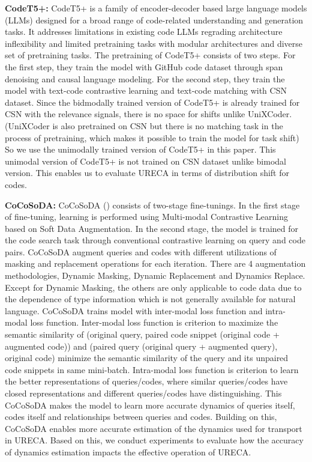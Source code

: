 \textbf{CodeT5+: }
CodeT5+ is a family of encoder-decoder based large language models (LLMs) designed 
for a broad range of code-related understanding and generation tasks.
It addresses limitations in existing code LLMs regrading architecture inflexibility 
and limited pretraining tasks with modular architectures and diverse set of pretraining tasks.
The pretraining of CodeT5+ consists of two steps. 
For the first step, they train the model with GitHub code dataset through span denoising and 
causal language modeling.
For the second step, they train the model with text-code contrastive learning and 
text-code matching with CSN dataset.
Since the bidmodally trained version of CodeT5+ is already trained for CSN with the relevance signals, 
there is no space for shifts unlike UniXCoder. 
(UniXCoder is also pretrained on CSN but there is no matching task in the process of pretraining, 
which makes it possible to train the model for task shift)
So we use the unimodally trained version of CodeT5+ in this paper. 
This unimodal version of CodeT5+ is not trained on CSN dataset unlike bimodal version.
This enables us to evaluate URECA in terms of distribution shift for codes.

\textbf{CoCoSoDA: }
CoCoSoDA (\cite{EnshenYWLHSDH23}) consists of two-stage fine-tunings.
In the first stage of fine-tuning, learning is performed using Multi-modal Contrastive Learning 
based on Soft Data Augmentation. 
In the second stage, the model is trained for the code search task through conventional contrastive learning 
on query and code pairs.
CoCoSoDA augment queries and codes with different utilizations of masking and replacement operations 
for each iteration.
There are 4 augmentation methodologies, Dynamic Masking, Dynamic Replacement and Dynamics Replace.
Except for Dynamic Masking, the others are only applicable to code data 
due to the dependence of type information which is not generally available for natural language.
CoCoSoDA trains model with inter-modal loss function and intra-modal loss function.
Inter-modal loss function is criterion to maximize the semantic similarity of 
(original query, paired code snippet (original code + augmented code)) and 
(paired query (original query + augmented query), original code) minimize the semantic similarity 
of the query and its unpaired code snippets in same mini-batch.
Intra-modal loss function is criterion to learn the better representations of queries/codes, 
where similar queries/codes have closed representations and different queries/codes have distinguishing.
This CoCoSoDA makes the model to learn more accurate dynamics of queries itself, 
codes itself and relationships between queries and codes.
Building on this, CoCoSoDA enables more accurate estimation of the dynamics used for transport in URECA. 
Based on this, we conduct experiments to evaluate how the accuracy of dynamics estimation impacts 
the effective operation of URECA.

